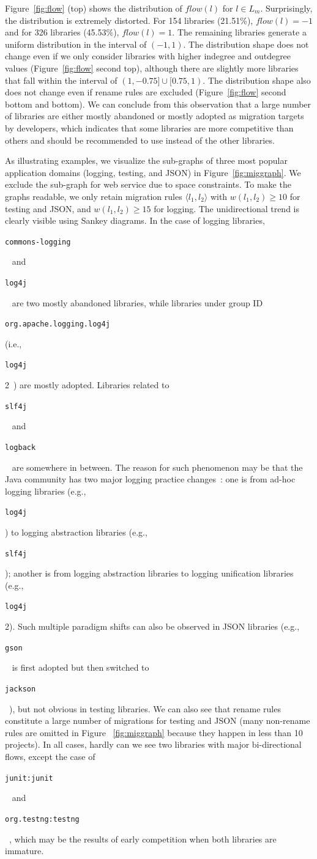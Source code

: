 \documentclass[sigconf, screen]{acmart}
\newcommand{\Code}[1]{\begin{small}\texttt{#1}\end{small}}
\begin{document}
Figure~\ref{fig:flow} (top) shows the distribution of $flow(l)$ for $l \in L_m$.
Surprisingly, the distribution is extremely distorted.
For 154 libraries (21.51\%), $flow(l) = -1$ and for 326 libraries (45.53\%), $flow(l) = 1$.
The remaining libraries generate a uniform distribution in the interval of $(-1, 1)$.
The distribution shape does not change even if we only consider libraries with higher indegree and outdegree values (Figure~\ref{fig:flow} second top), although there are slightly more libraries that fall within the interval of $(1, -0.75] \cup [0.75, 1)$.
The distribution shape also does not change even if rename rules are excluded (Figure~\ref{fig:flow} second bottom and bottom).
We can conclude from this observation that a large number of libraries are either mostly abandoned or mostly adopted as migration targets by developers, which indicates that some libraries are more competitive than others and should be recommended to use instead of the other libraries.

As illustrating examples, we visualize the sub-graphs of three most popular application domains (logging, testing, and JSON) in Figure~\ref{fig:miggraph}.
We exclude the sub-graph for web service due to space constraints.
To make the graphs readable, we only retain migration rules $\langle l_1, l_2 \rangle$ with $w(l_1, l_2) \ge 10$ for testing and JSON, and $w(l_1, l_2) \ge 15$ for logging.
The unidirectional trend is clearly visible using Sankey diagrams.
In the case of logging libraries, \Code{commons-logging}~\cite{commons-logging} and \Code{log4j}~\cite{log4j} are two mostly abandoned libraries, while libraries under group ID \Code{org.apache.logging.log4j}  (i.e., \Code{log4j} 2~\cite{log4j2}) are mostly adopted. 
Libraries related to \Code{slf4j}~\cite{slf4j} and \Code{logback}~\cite{logback} are somewhere in between.
The reason for such phenomenon may be that the Java community has two major logging practice changes~\cite{kabinna2016logging}: one is from ad-hoc logging libraries (e.g., \Code{log4j}) to logging abstraction libraries (e.g., \Code{slf4j}); another is from logging abstraction libraries to logging unification libraries (e.g., \Code{log4j} 2).
Such multiple paradigm shifts can also be observed in JSON libraries (e.g., \Code{gson}~\cite{gson} is first adopted but then switched to \Code{jackson}~\cite{jackson}), but not obvious in testing libraries.
We can also see that rename rules constitute a large number of migrations for testing and JSON (many non-rename rules are omitted in Figure ~\ref{fig:miggraph} because they happen in less than 10 projects).
In all cases, hardly can we see two libraries with major bi-directional flows, except the case of \Code{junit:junit}~\cite{junit4} and \Code{org.testng:testng}~\cite{testng}, which may be the results of early competition when both libraries are immature.
\end{document}
